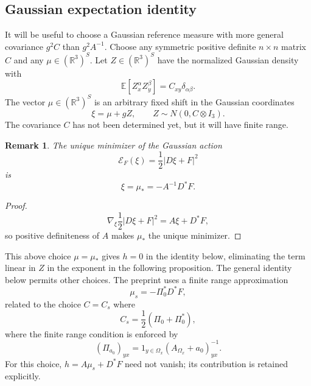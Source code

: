\documentclass[11pt]{article}
\newcommand{\R}{\mathbb R}
\newcommand{\E}{\mathbb E}
\numberwithin{equation}{section}
\newtheorem{remark}[theorem]{Remark}
\theoremstyle{definition}
\theoremstyle{plain}
\begin{document}
\subsection{Gaussian expectation identity}

It will be useful to choose a Gaussian reference measure with more general covariance $g^2C$ than $g^2 A^{-1}$.
Choose any symmetric positive definite $n\times n$ matrix $C$
and any $\mu\in(\R^3)^S$.
Let $Z\in(\R^3)^S$ have the normalized Gaussian density with
\begin{equation}
\E[Z_x^\alpha Z_y^\beta]=C_{xy}\delta_{\alpha\beta}.
\end{equation}
%
The vector $\mu\in(\R^3)^S$ is an arbitrary fixed shift in
the Gaussian coordinates
\begin{equation}
 \xi=\mu+gZ,\qquad Z\sim N(0,C\otimes I_3).
\end{equation}
The covariance $C$ has not been determined yet, but it will have finite range.

\begin{remark}
The unique minimizer of the Gaussian action
\begin{equation}
\mathcal E_F(\xi)=
\frac12|D\xi+F|^2
\end{equation}
is 
\begin{equation}
\xi = \mu_*=-A^{-1}D^*F.
\end{equation}
\end{remark}

\begin{proof}
\begin{equation}
 \nabla_\xi\frac12|D\xi+F|^2=A\xi+D^*F,
\end{equation}
so positive definiteness of $A$ makes $\mu_*$ the unique minimizer. 
\end{proof}

This above choice $\mu=\mu_*$ gives $h=0$ in the identity below, eliminating the term linear in $Z$ in the exponent in the following proposition.
The general identity below permits other choices. The preprint uses a finite range approximation
\begin{equation}
 \mu_s=-\Pi_0^*D^*F,
\end{equation}
related to the choice $C=C_s$ where
\begin{equation}
  C_s = \frac12 (\Pi_0+\Pi_0^*),
\end{equation}
where the finite range condition is enforced by
\begin{equation}
  (\Pi_{a_0})_{yx} = 1_{y\in\Omega_x} (A_{\Omega_x} +a_0)^{-1}_{yx}.
\end{equation}
For this choice, $h=A\mu_s+D^*F$ need not vanish;
its contribution is retained explicitly.
\end{document}

